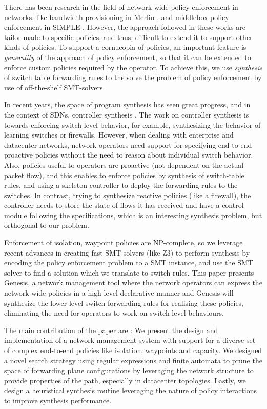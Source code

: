 \documentclass[]{sig}
\begin{document}
There has been research in the field of network-wide policy enforcement in networks, like bandwidth provisioning in Merlin \cite{Merlin}, and middlebox policy enforcement in SIMPLE \cite{simple}. However, the approach followed in these works are tailor-made to  specific policies, and thus, difficult to extend it to support other kinds of policies. To support a cornucopia of policies, an important feature is \emph{generality} of the approach of policy enforcement, so that it can be extended to enforce custom policies required by the operator. To achieve this, we use \emph{synthesis} of switch table forwarding rules to the solve the problem of policy enforcement by use of off-the-shelf SMT-solvers.


In recent years, the space of program synthesis has seen great progress, and in the context of SDNs, controller synthesis \cite{netegg}. The work on controller synthesis is towards enforcing switch-level behavior, for example, synthesizing the behavior of learning switches or firewalls. However, when dealing with enterprise and datacenter networks, network operators need support for specifying end-to-end proactive policies without the need to reason about individual switch behavior. Also, policies useful to operators are proactive (not dependent on the actual packet flow), and this enables to enforce policies by synthesis of switch-table rules, and using a skeleton controller to deploy the forwarding rules to the switches. In contrast, trying to synthesize reactive policies (like a firewall), the controller needs to store the state of flows it has received and have a control module following the specifications, which is an interesting synthesis problem, but orthogonal to our problem.

 Enforcement of isolation, waypoint policies are NP-complete, so we leverage recent advances in creating fast SMT solvers (like Z3) to perform synthesis by encoding the policy enforcement problem to a SMT instance, and use the SMT solver to find a solution which we translate to switch rules. This paper presents Genesis, a network management tool where the network operators can express the network-wide policies in a high-level declarative manner and Genesis will synthesize the lower-level switch forwarding rules for realising these policies, eliminating the need for operators to work on switch-level behaviours. 

The main contribution of the paper are : We present the design and implementation of a network management system with support for a diverse set of complex end-to-end policies like isolation, waypoints and capacity. We designed a novel search strategy using regular expressions and finite automata to prune the space of forwarding plane configurations by leveraging the network structure to provide properties of the path, especially in datacenter topologies. Lastly, we design a heuristical synthesis routine leveraging the nature of policy interactions to improve synthesis performance.
\end{document}
